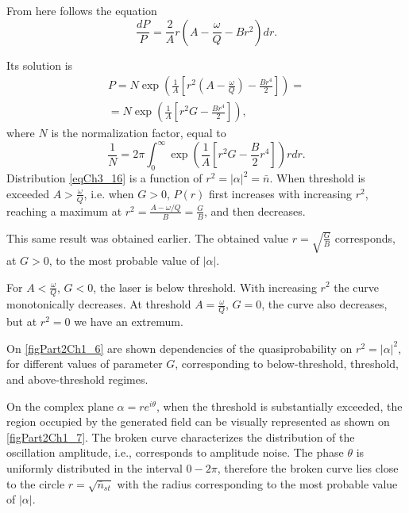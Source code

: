 From here follows the equation
\begin{equation}
\frac{d P}{P} = 
\frac{2}{A} r \left(A - \frac{\omega}{Q} - B r^2\right)d r. 
\label{eqCh3_15}
\end{equation}

Its solution is
\begin{eqnarray}
P = N \exp \left(\frac{1}{A}
\left[
r^2 \left(A - \frac{\omega}{Q}\right)
 - 
\frac{B r^4}{2}
\right]
\right) = 
\nonumber \\
= 
N \exp \left(\frac{1}{A}
\left[
r^2 G
 - 
\frac{B r^4}{2}
\right]
\right),
\label{eqCh3_16}
\end{eqnarray}
where $N$ is the normalization factor, equal to
\[
\frac{1}{N} = 2 \pi \int_0^{\infty}
\exp\left(
\frac{1}{A}\left[
r^2 G - \frac{B}{2}r^4
\right]
\right)
r dr.
\]
Distribution \eqref{eqCh3_16}
is a function of $r^2 = \left|\alpha\right|^2 = \bar{n}$. When
threshold is exceeded $A > \frac{\omega}{Q}$, i.e. when $G > 0$,
$P\left(r\right)$ first increases with increasing $r^2$, reaching a maximum at
$r^2 = \frac{A - \omega/Q}{B} = \frac{G}{B}$, and then decreases.  

This same result was obtained earlier. The obtained value $r =
\sqrt{\frac{G}{B}}$ corresponds, at $G > 0$, to the most probable
value of $\left|\alpha\right|$.
  
For $A < \frac{\omega}{Q}$, $G < 0$, the laser is below threshold. With
increasing $r^2$ the curve monotonically decreases. At threshold $A =
\frac{\omega}{Q}$, $G = 0$, the curve also decreases, but at $r^2 = 0$
we have an extremum.   



On \autoref{figPart2Ch1_6} are shown dependencies of the quasiprobability on $r^2 =
\left|\alpha\right|^2$, for different values of parameter $G$,
corresponding to below-threshold, threshold, and above-threshold regimes. 

On the complex plane $\alpha = r e^{i \theta}$, when the threshold is substantially
exceeded, the region occupied by the generated field can be visually
represented as shown on
\autoref{figPart2Ch1_7}. The broken curve characterizes the
distribution of the oscillation amplitude, i.e., corresponds to amplitude
noise. The phase $\theta$ is uniformly distributed in the interval $0 - 2\pi$,
therefore the broken curve lies close to the circle $r =
\sqrt{\bar{n}_{st}}$ with the radius corresponding to the most probable
value of $\left|\alpha\right|$. 



